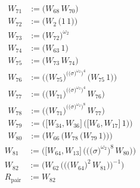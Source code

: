 \begin{align*}
W_{71} &:= \bigl(W_{68}\,W_{70}\bigr) \\
W_{72} &:= \bigl(W_{2}\,\bigl(1\,1\bigr)\bigr) \\
W_{73} &:= \bigl(W_{72}\bigr)^{\omega_2} \\
W_{74} &:= \bigl(W_{63}\,1\bigr) \\
W_{75} &:= \bigl(W_{73}\,W_{74}\bigr) \\
W_{76} &:= \bigl(\bigl(W_{75}\bigr)^{\bigl(\bigl(\sigma\bigr)^{\omega_2}\bigr)^{4}}\,\bigl(W_{75}\,1\bigr)\bigr) \\
W_{77} &:= \bigl(\bigl(W_{71}\bigr)^{\bigl(\bigl(\sigma\bigr)^{\omega_2}\bigr)^{4}}\,W_{76}\bigr) \\
W_{78} &:= \bigl(\bigl(W_{71}\bigr)^{\bigl(\bigl(\sigma\bigr)^{\omega_2}\bigr)^{8}}\,W_{77}\bigr) \\
W_{79} &:= \bigl(\bigl[W_{34},W_{36}\bigr]\,\bigl(\bigl[W_{6},W_{17}\bigr]\,1\bigr)\bigr) \\
W_{80} &:= \bigl(W_{66}\,\bigl(W_{78}\,\bigl(W_{79}\,1\bigr)\bigr)\bigr)
\end{align*}
\begin{align*}
W_{81} &:= \bigl(\bigl[W_{64},W_{13}\bigr]\,\bigl(\bigl(\bigl(\sigma\bigr)^{\omega_2}\bigr)^{8}\,W_{80}\bigr)\bigr) \\
W_{82} &:= \bigl(W_{62}\,\bigl(\bigl(\bigl(W_{64}\bigr)^{2}\,W_{81}\bigr)\bigr)^{-1}\bigr) \\
R_{\mathrm{pair}} &:= W_{82}
\end{align*}
